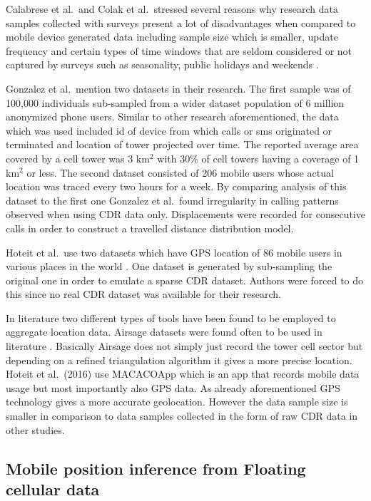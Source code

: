 \documentclass[12pt, a4paper]{report}
\theoremstyle{definition}
\theoremstyle{definition}%
\theoremstyle{definition}%
\theoremstyle{definition}%
\theoremstyle{definition}%
\theoremstyle{definition}%
\begin{document}
Calabrese et al.\ and Colak et al.\ stressed several reasons why research data samples collected with surveys present a lot of disadvantages when compared to mobile device generated data including sample size which is smaller, update frequency and certain types of time windows that are seldom considered or not captured by surveys such as seasonality, public holidays and weekends \cite{Calabrese2013,Colak2015}.   

Gonzalez et al.\ mention two datasets in their research. The first sample was of 100,000 individuals sub-sampled from a wider dataset population of 6 million anonymized  phone users. Similar to other research aforementioned, the data which was used included id of device from which calls or sms originated or terminated and location of tower projected over time. The reported average area covered by a cell tower was 3 km$^{2}$ with 30\% of cell towers having a coverage of 1 km$^{2}$ or less. The second dataset consisted of 206 mobile users whose actual location was traced every two hours for a week. By comparing analysis of this dataset to the first one Gonzalez et al.\ found irregularity in calling patterns observed when using CDR data only. Displacements were recorded for consecutive calls in order to construct a travelled distance distribution model.

Hoteit et al.\ use two datasets which have GPS location of 86 mobile users in various places in the world \cite{Hoteit2016}. One dataset is generated by sub-sampling the original one in order to emulate a sparse CDR dataset. Authors were forced to do this since no real CDR dataset was available for their research.  

In literature two different types of tools have been found to be employed to aggregate location data. Airsage datasets were found often to be used in literature \cite{Hoteit2014, Wang2013, Calabrese2013,Leduc2008,Wang2012, Colak2015}. Basically Airsage does not simply just record the tower cell sector but depending on a refined triangulation algorithm it gives a more precise location.  Hoteit et al.\ (2016) \cite{Hoteit2016} use MACACOApp which is an app that records mobile data usage but most importantly also GPS data. As already aforementioned GPS technology gives a more accurate geolocation. However the data sample size is smaller in comparison to data samples collected in the form of raw CDR data in other studies.

\subsection{Mobile position inference from Floating cellular data} \label{mobile_inference} 
\end{document}
